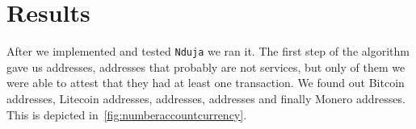 \newcommand{\accountGitlab}{2}

\newcommand{\accountBitbucket}{1}


\section{Results} \label{results}
After we implemented and tested \texttt{Nduja} we ran it. The first step of the
algorithm gave us \startingNumberAllWallets{} addresses,
\startingNumberWalletsNotService{} addresses that probably are not services,
but only \startingNumberWalletsAtLeastOneTransaction{} of them we were able to
attest that they had at least one transaction. We found out \startingBTC{}
Bitcoin addresses, \startingLTC{} Litecoin addresses, \startingDOGE{}
addresses, \startingETH{} addresses and finally \startingXMR{} Monero
addresses. This is depicted in~\autoref{fig:numberaccountcurrency}.


